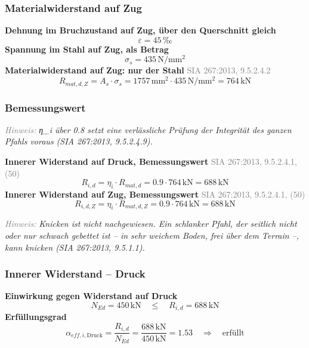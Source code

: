 \documentclass[11pt,a4paper]{article}
\newcommand{\normref}[1]{{\small\textcolor{gray}{#1}}}
\newcommand{\hinweis}[2]{\par\noindent\textcolor{gray}{\textit{#1:}} \textit{#2}\par}
\begin{document}
\subsubsection{Materialwiderstand auf Zug}
\noindent\textbf{Dehnung im Bruchzustand auf Zug, über den Querschnitt gleich}
\begin{equation*}
\varepsilon = 45\,\text{‰}
\end{equation*}
\noindent\textbf{Spannung im Stahl auf Zug, als Betrag}
\begin{equation*}
\sigma_s = 435\,\mathrm{N}/\mathrm{mm}^{2}
\end{equation*}
\noindent\textbf{Materialwiderstand auf Zug: nur der Stahl} \hfill \normref{SIA 267:2013, 9.5.2.4.2}
\begin{equation*}
R_{mat,d,Z} = A_s \cdot \sigma_s = 1757\,\mathrm{mm}^{2} \cdot 435\,\mathrm{N}/\mathrm{mm}^{2} = 764\,\mathrm{kN}
\end{equation*}
\subsubsection{Bemessungswert}
\hinweis{Hinweis}{η\_i über 0.8 setzt eine verlässliche Prüfung der Integrität des ganzen Pfahls voraus (SIA 267:2013, 9.5.2.4.9).}
\noindent\textbf{Innerer Widerstand auf Druck, Bemessungswert} \hfill \normref{SIA 267:2013, 9.5.2.4.1, (50)}
\begin{equation*}
R_{i,d} = \eta_i \cdot R_{mat,d} = 0.9 \cdot 764\,\mathrm{kN} = 688\,\mathrm{kN}
\end{equation*}
\noindent\textbf{Innerer Widerstand auf Zug, Bemessungswert} \hfill \normref{SIA 267:2013, 9.5.2.4.1, (50)}
\begin{equation*}
R_{i,d,Z} = \eta_i \cdot R_{mat,d,Z} = 0.9 \cdot 764\,\mathrm{kN} = 688\,\mathrm{kN}
\end{equation*}
\hinweis{Hinweis}{Knicken ist nicht nachgewiesen. Ein schlanker Pfahl, der seitlich nicht oder nur schwach gebettet ist -- in sehr weichem Boden, frei über dem Terrain --, kann knicken (SIA 267:2013, 9.5.1.1).}
\subsubsection{Innerer Widerstand – Druck}
\noindent\textbf{Einwirkung gegen Widerstand auf Druck}
\begin{equation*}
N_{Ed} = 450\,\mathrm{kN} \quad \le \quad R_{i,d} = 688\,\mathrm{kN}
\end{equation*}
\noindent\textbf{Erfüllungsgrad}
\begin{equation*}
\alpha_{eff,i,\text{Druck}} = \frac{R_{i,d}}{N_{Ed}} = \frac{688\,\mathrm{kN}}{450\,\mathrm{kN}} = 1.53 \quad \Rightarrow \quad \text{erfüllt}
\end{equation*}
\end{document}
